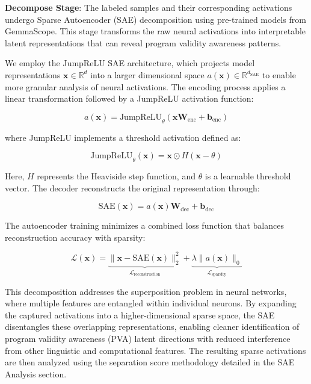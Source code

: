 \documentclass[11pt]{article}
\begin{document}
\textbf{Decompose Stage}: The labeled samples and their corresponding activations undergo Sparse Autoencoder (SAE) decomposition using pre-trained models from GemmaScope. This stage transforms the raw neural activations into interpretable latent representations that can reveal program validity awareness patterns.

We employ the JumpReLU SAE architecture, which projects model representations $\mathbf{x} \in \mathbb{R}^d$ into a larger dimensional space $a(\mathbf{x}) \in \mathbb{R}^{d_{\text{SAE}}}$ to enable more granular analysis of neural activations. The encoding process applies a linear transformation followed by a JumpReLU activation function:

\begin{equation}
    a(\mathbf{x})=\text{JumpReLU}_{\theta}(\mathbf{xW}_{\text{enc}}+\mathbf{b}_{\text{enc}})
\end{equation}

where JumpReLU implements a threshold activation defined as:

\begin{equation}
    \text{JumpReLU}_\theta(\mathbf{x}) = \mathbf{x} \odot H(\mathbf{x} - \theta)
\end{equation}

Here, $H$ represents the Heaviside step function, and $\theta$ is a learnable threshold vector. The decoder reconstructs the original representation through:

\begin{equation}
    \text{SAE}(\mathbf{x})=a(\mathbf{x})\mathbf{W}_{\text{dec}}+\mathbf{b}_{\text{dec}}
\end{equation}

The autoencoder training minimizes a combined loss function that balances reconstruction accuracy with sparsity:

\begin{equation}
    \mathcal{L}(\mathbf{x}) = \underbrace{\|\mathbf{x} - \text{SAE}(\mathbf{x})\|_2^2}_{\mathcal{L}_{\text{reconstruction}}} + \underbrace{\lambda \|a(\mathbf{x})\|_0}_{\mathcal{L}_{\text{sparsity}}}
\end{equation}

This decomposition addresses the superposition problem in neural networks, where multiple features are entangled within individual neurons. By expanding the captured activations into a higher-dimensional sparse space, the SAE disentangles these overlapping representations, enabling cleaner identification of program validity awareness (PVA) latent directions with reduced interference from other linguistic and computational features. The resulting sparse activations are then analyzed using the separation score methodology detailed in the SAE Analysis section.
\end{document}
